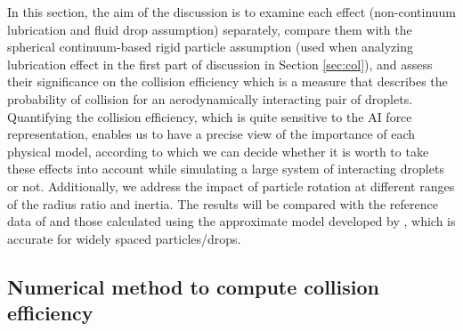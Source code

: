\documentclass[../thesis.tex]{subfiles}
\begin{document}
In this section, the aim of the discussion is to examine each effect (non-continuum lubrication and fluid drop assumption) separately, compare them with the spherical continuum-based rigid particle assumption (used when analyzing lubrication effect in the first part of discussion in Section \ref{sec:col}), and assess their significance on the collision efficiency which is a measure that describes the probability of collision for an aerodynamically interacting pair of droplets. Quantifying the collision efficiency, which is quite sensitive to the AI force representation, enables us to have a precise view of the importance of each physical model, according to which we can decide whether it is worth to take these effects into account while simulating a large system of interacting droplets or not. Additionally, we address the impact of particle rotation at different ranges of the radius ratio and inertia. The results will be compared with the reference data of \cite{RSD22} and those calculated using the approximate model developed by \cite{WAG05}, which is accurate for widely spaced particles/drops.

\subsection{Numerical method to compute collision efficiency}
\end{document}
